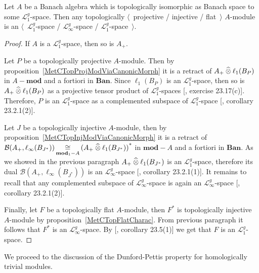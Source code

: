 \begin{proposition}\label{TopProjInjFlatModOverMthscrL1SpCharac} Let $A$ be a
Banach algebra which is topologically isomorphic as Banach space to some
$\mathscr{L}_1^g$-space. Then any topologically $\langle$~projective / injective
/ flat~$\rangle$ $A$-module is an $\langle$~$\mathscr{L}_1^g$-space /
$\mathscr{L}_\infty^g$-space / $\mathscr{L}_1^g$-space~$\rangle$.
\end{proposition}
\begin{proof} If $A$ is a $\mathscr{L}_1^g$-space, then so is $A_+$. 

Let $P$ be a topologically projective $A$-module. Then by
proposition~\ref{MetCTopProjModViaCanonicMorph} it is a retract 
of $A_+\mathbin{\widehat{\otimes}} \ell_1(B_P)$ in $A-\mathbf{mod}$ and a fortiori 
in $\mathbf{Ban}$. Since
$\ell_1(B_P)$ is an $\mathscr{L}_1^g$-space, then so is
$A_+\mathbin{\widehat{\otimes}}\ell_1(B_P)$ as a projective tensor product of
$\mathscr{L}_1^g$-spaces [\cite{DefFloTensNorOpId}, exercise 23.17(c)].
Therefore, $P$ is an $\mathscr{L}_1^g$-space as a complemented subspace of
$\mathscr{L}_1^g$-space [\cite{DefFloTensNorOpId}, corollary 23.2.1(2)].

Let $J$ be a topologically injective $A$-module, then by
proposition~\ref{MetCTopInjModViaCanonicMorph} it is a retract of
$\mathcal{B}(A_+,\ell_\infty(B_{J^*}))
\mathop{\mathbin{\cong}}\limits_{\mathbf{mod}_1-A}
{(A_+\mathbin{\widehat{\otimes}}\ell_1(B_{J^*}))}^*$
in $\mathbf{mod}-A$ and a fortiori in $\mathbf{Ban}$. As we showed in the
previous paragraph $A_+\mathbin{\widehat{\otimes}}\ell_1(B_{J^*})$ is an $\mathscr{L}_1^g$-space,
therefore its dual $\mathcal{B}(A_+,\ell_\infty(B_{J^*}))$ is an
$\mathscr{L}_\infty^g$-space [\cite{DefFloTensNorOpId}, corollary 23.2.1(1)]. It
remains to recall that any complemented subspace of $\mathscr{L}_\infty^g$-space
is again an $\mathscr{L}_\infty^g$-space [\cite{DefFloTensNorOpId}, corollary
23.2.1(2)].

Finally, let $F$ be a topologically flat $A$-module, then $F^*$ is topologically
injective $A$-module by proposition~\ref{MetCTopFlatCharac}. From previous
paragraph it follows that $F^*$ is an $\mathscr{L}_\infty^g$-space. By
[\cite{DefFloTensNorOpId}, corollary 23.5(1)] we get that $F$ is an
$\mathscr{L}_1^g$-space.
\end{proof}

We proceed to the discussion of the Dunford-Pettis property for homologically
trivial modules.   

